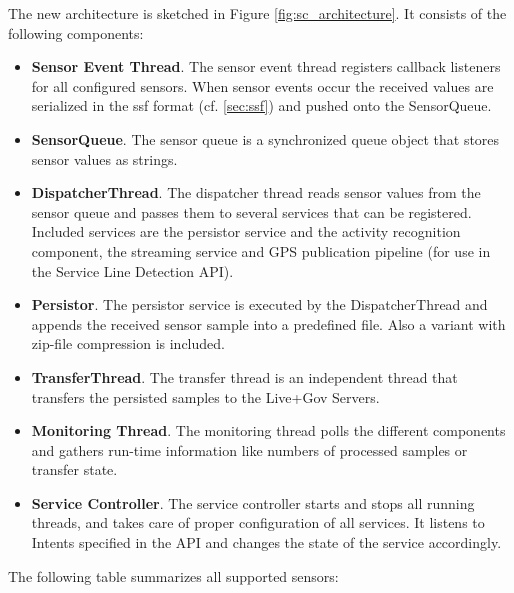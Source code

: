 The new architecture is sketched in Figure \ref{fig:sc_architecture}.
It consists of the following components:

\begin{itemize}
\item {\bf Sensor Event Thread}. The sensor event thread registers
  callback listeners for all configured sensors. When sensor events
  occur the received values are serialized in the ssf
  format (cf. \ref{sec:ssf}) and pushed onto the SensorQueue.
\item {\bf SensorQueue}. The sensor queue is a synchronized queue
  object that stores sensor values as strings.
\item {\bf DispatcherThread}. The dispatcher thread reads sensor
  values from the sensor queue and passes them to several services
  that can be registered. Included services are the persistor service
  and the activity recognition component, the streaming service and GPS
  publication pipeline (for use in the Service Line Detection API).
\item {\bf Persistor}. The persistor service is executed by the
  DispatcherThread and appends the received sensor sample into a
  predefined file. Also a variant with zip-file compression is
  included.
\item {\bf TransferThread}. The transfer thread is an independent
  thread that transfers the persisted samples to the Live+Gov Servers.
\item {\bf Monitoring Thread}. The monitoring thread polls the
  different components and gathers run-time information like numbers
  of processed samples or transfer state.
\item {\bf Service Controller}. The service controller starts and
  stops all running threads, and takes care of proper configuration of
  all services. It listens to Intents specified in the API and changes
  the state of the service accordingly.
\end{itemize}


The following table summarizes all supported sensors:


